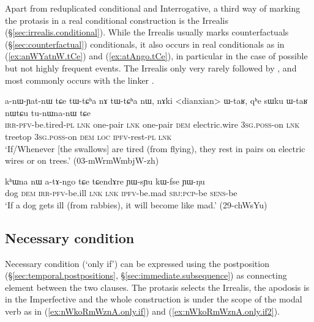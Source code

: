 Apart from reduplicated conditional and Interrogative, a third way of marking the protasis in a real conditional construction is the Irrealis (§\ref{sec:irrealis.conditional}). While the Irrealis usually marks counterfactuals (§\ref{sec:counterfactual}) conditionals, it also occurs in real conditionals as in (\ref{ex:anWYatnW.tCe}) and (\ref{ex:atAngo.tCe}), in particular in the case of possible but not highly frequent events. The Irrealis only very rarely followed by , and most commonly occurs with the linker .
\largerpage
\begin{exe}
\ex \label{ex:anWYatnW.tCe}
 \gll a-nɯ-ɲat-nɯ tɕe tɯ-tɕʰa nɤ tɯ-tɕʰa nɯ, nɤki <dianxian> ɯ-taʁ,  qʰe sɯku ɯ-taʁ nɯtɕu tu-nɯna-nɯ tɕe \\
 \textsc{irr}-\textsc{pfv}-be.tired-\textsc{pl} \textsc{lnk} one-pair \textsc{lnk} one-pair \textsc{dem} electric.wire \textsc{3sg}.\textsc{poss}-on \textsc{lnk} treetop \textsc{3sg}.\textsc{poss}-on \textsc{dem} \textsc{loc} \textsc{ipfv}-rest-\textsc{pl} \textsc{lnk} \\
\glt `If/Whenever  [the swallows] are tired (from flying), they rest in pairs on electric wires or on trees.' (03-mWrmWmbjW-zh)
\end{exe}


\begin{exe}
\ex \label{ex:atAngo.tCe}
 \gll kʰɯna nɯ a-tɤ-ngo tɕe tɕendɤre ɲɯ-sɲu kɯ-fse ɲɯ-ŋu \\
 dog \textsc{dem} \textsc{irr}-\textsc{pfv}-be.ill \textsc{lnk} \textsc{lnk} \textsc{ipfv}-be.mad \textsc{sbj}:\textsc{pcp}-be \textsc{sens}-be \\
\glt `If a dog gets ill (from rabbies), it will become like mad.' (29-chWsYu)
\end{exe}

 
 
\subsection{Necessary condition} \label{sec:only.if}
Necessary condition (`only if') can be expressed using the postposition  (§\ref{sec:temporal.postpositions}, §\ref{sec:immediate.subsequence}) as connecting element between the two clauses. The protasis selects the Irrealis, the apodosis is in the Imperfective and the whole construction is under the scope of the modal verb  as in  (\ref{ex:nWkoRmWznA.only.if}) and (\ref{ex:nWkoRmWznA.only.if2}).

